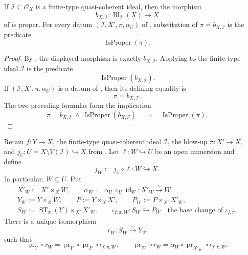 \begin{lemma}
  \label{lemma:nagata-blowup-proper}

  If $\mathcal I\subseteq\mathcal O_X$ is a finite-type quasi-coherent ideal,
  then the morphism
  \[
    b_{X,\mathcal I}\colon\operatorname{Bl}_{\mathcal I}(X)\to X
  \]
  of  is proper.  For every datum
  $(\mathcal I,X',\pi,\alpha_U)$ of
  , substitution of
  $\pi=b_{X,\mathcal I}$ is the predicate
  \[
    \operatorname{IsProper}(\pi).
  \]
\end{lemma}

\begin{proof}
  By , the displayed morphism is exactly
  $b_{X,\mathcal I}$.  Applying
   to the finite-type ideal
  $\mathcal I$ is the predicate
  \[
    \operatorname{IsProper}(b_{X,\mathcal I}).
  \]
  If $(\mathcal I,X',\pi,\alpha_U)$ is a datum of
  , then its defining equality is
  \[
    \pi=b_{X,\mathcal I}.
  \]
  The two preceding formulas form the implication
  \[
    \pi=b_{X,\mathcal I}
      \ \wedge\ 
    \operatorname{IsProper}(b_{X,\mathcal I})
      \quad\Longrightarrow\quad
    \operatorname{IsProper}(\pi).
  \]
\end{proof}

\begin{lemma}
  \label{lemma:nagata-strict-transform-restrict}

  Retain $f\colon Y\to X$, the finite-type quasi-coherent ideal
  $\mathcal I$, the blow-up $\pi\colon X'\to X$, and
  $j_U\colon U=X\setminus V(\mathcal I)\hookrightarrow X$ from
  .  Let
  $\ell\colon W\hookrightarrow U$ be an open immersion and define
  \[
    j_W:=j_U\circ\ell\colon W\hookrightarrow X.
  \]
  In particular, $W\subseteq U$.  Put
  \[
  \begin{gathered}
    X'_W:=X'\times_XW,\qquad
    \alpha_W:=\alpha_U\times_U\operatorname{id}_W
      \colon X'_W\xrightarrow{\sim}W,\\
    Y_W:=Y\times_XW,\qquad
    P:=Y\times_XX',\qquad
    P_W:=P\times_{X'}X'_W,\\
    S_W:=\operatorname{ST}_\pi(Y)\times_{X'}X'_W,\qquad
    \iota_{f,\pi,W}\colon S_W\hookrightarrow P_W
      \quad\text{the base change of }\iota_{f,\pi}.
  \end{gathered}                                                   \tag{SR1}
  \]
  There is a unique isomorphism
  \[
    r_W\colon S_W\xrightarrow{\sim}Y_W
  \]
  such that
  \[
    \operatorname{pr}_Y\circ r_W
      =\operatorname{pr}_Y\circ\operatorname{pr}_P\circ
        \iota_{f,\pi,W},
    \qquad
    \operatorname{pr}_W\circ r_W
      =\alpha_W\circ\operatorname{pr}_{X'_W}\circ
        \iota_{f,\pi,W}.
  \]
\end{lemma}

